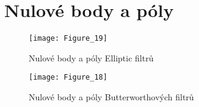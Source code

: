 \section{Nulové body a póly}
\begin{figure}[H] 
	\centering
	\texttt{[image: Figure\_19]}
	\caption{Nulové body a póly Elliptic filtrů}
\end{figure}

\begin{figure}[H] 
	\centering
	\texttt{[image: Figure\_18]}
	\caption{Nulové body a póly Butterworthových filtrů}
\end{figure}